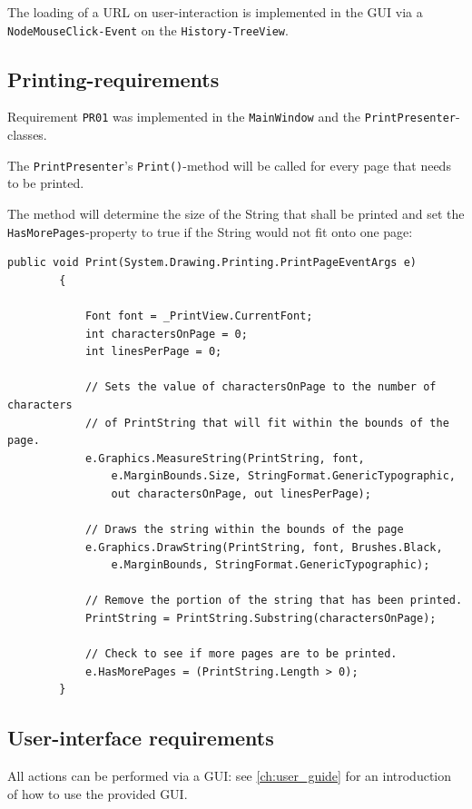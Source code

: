 The loading of a \ac{URL} on user-interaction is implemented in the \ac{GUI} via a \texttt{NodeMouseClick-Event} on the \texttt{History-TreeView}.

\subsection{Printing-requirements}

Requirement \texttt{PR01} was implemented in the \texttt{MainWindow} and the \texttt{PrintPresenter}-classes.

The \texttt{PrintPresenter}'s \texttt{Print()}-method will be called for every page that needs to be printed.

The method will determine the size of the String that shall be printed and set the \texttt{HasMorePages}-property to true if the String would not fit onto one page:

\begin{lstlisting}[caption=Printing.]
public void Print(System.Drawing.Printing.PrintPageEventArgs e)
        {
            
            Font font = _PrintView.CurrentFont;
            int charactersOnPage = 0;
            int linesPerPage = 0;

            // Sets the value of charactersOnPage to the number of characters 
            // of PrintString that will fit within the bounds of the page.
            e.Graphics.MeasureString(PrintString, font,
                e.MarginBounds.Size, StringFormat.GenericTypographic,
                out charactersOnPage, out linesPerPage);

            // Draws the string within the bounds of the page
            e.Graphics.DrawString(PrintString, font, Brushes.Black,
                e.MarginBounds, StringFormat.GenericTypographic);

            // Remove the portion of the string that has been printed.
            PrintString = PrintString.Substring(charactersOnPage);

            // Check to see if more pages are to be printed.
            e.HasMorePages = (PrintString.Length > 0);
        }
\end{lstlisting}

\subsection{User-interface requirements}

All actions can be performed via a \ac{GUI}: see \autoref{ch:user_guide} for an introduction of how to use the provided \ac{GUI}.

